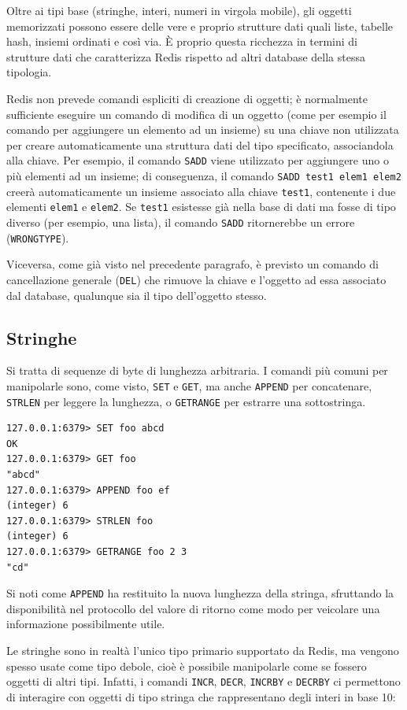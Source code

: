 Oltre ai tipi base (stringhe, interi, numeri in virgola mobile), gli oggetti memorizzati
possono essere delle vere e proprio strutture dati quali liste, tabelle hash, insiemi
ordinati e così via. È proprio questa ricchezza in termini di strutture dati che caratterizza
Redis rispetto ad altri database della stessa tipologia.

Redis non prevede comandi espliciti di creazione di oggetti; è normalmente sufficiente
eseguire un comando di modifica di un oggetto (come per esempio il comando per aggiungere
un elemento ad un insieme) su una chiave non utilizzata per creare automaticamente una
struttura dati del tipo specificato, associandola alla chiave. Per esempio, il comando
\verb|SADD| viene utilizzato per aggiungere uno o più elementi ad un insieme; di
conseguenza, il comando \verb|SADD test1 elem1 elem2| creerà automaticamente un insieme 
associato alla chiave \verb|test1|, contenente i due elementi \verb|elem1| e \verb|elem2|.
Se \verb|test1| esistesse già nella base di dati ma fosse di tipo diverso (per esempio,
una lista), il comando \verb|SADD| ritornerebbe un errore (\verb|WRONGTYPE|).

Viceversa, come già visto nel precedente paragrafo, è previsto un comando di cancellazione
generale (\verb|DEL|) che rimuove la chiave e l'oggetto ad essa associato dal database,
qualunque sia il tipo dell'oggetto stesso.


\subsection{Stringhe}

Si tratta di sequenze di byte di lunghezza arbitraria. I comandi
più comuni per manipolarle sono, come visto, \verb|SET| e \verb|GET|, ma anche \verb|APPEND|
per concatenare, \verb|STRLEN| per leggere la lunghezza, o \verb|GETRANGE| per estrarre una
sottostringa.

\medskip
\begin{lstlisting}
127.0.0.1:6379> SET foo abcd
OK
127.0.0.1:6379> GET foo
"abcd"
127.0.0.1:6379> APPEND foo ef
(integer) 6
127.0.0.1:6379> STRLEN foo
(integer) 6
127.0.0.1:6379> GETRANGE foo 2 3
"cd"
\end{lstlisting}

Si noti come \verb|APPEND| ha restituito la nuova lunghezza della stringa, sfruttando
la disponibilità nel protocollo del valore di ritorno come modo per veicolare una
informazione possibilmente utile.

Le stringhe sono in realtà l'unico tipo primario supportato da Redis, ma vengono spesso usate come
tipo debole, cioè è possibile manipolarle come se fossero oggetti di altri tipi. Infatti, i comandi
\verb|INCR|, \verb|DECR|,  \verb|INCRBY| e \verb|DECRBY| ci permettono di interagire con oggetti di
tipo stringa che rappresentano degli interi in base 10:

